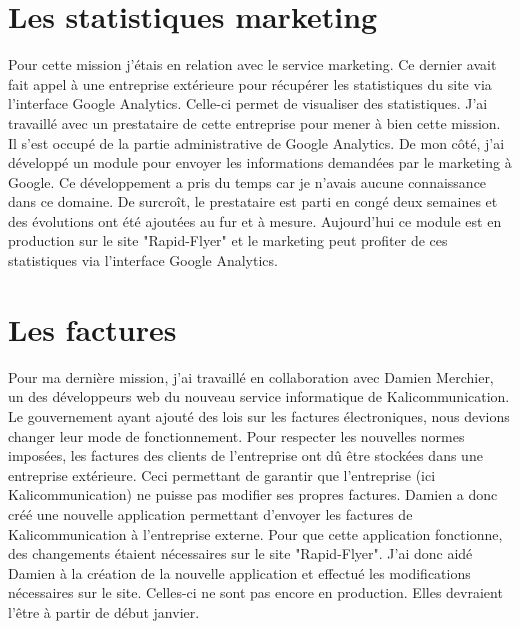 \section{Les statistiques marketing}
Pour cette mission j'étais en relation avec le service marketing. Ce dernier avait fait appel à une entreprise extérieure pour récupérer les statistiques du site via l'interface Google Analytics. Celle-ci permet de visualiser des statistiques.\newline
J'ai travaillé avec un prestataire de cette entreprise pour mener à bien cette mission. Il s'est occupé de la partie administrative de Google Analytics. De mon côté, j'ai développé un module pour envoyer les informations demandées par le marketing à Google. Ce développement a pris du temps car je n'avais aucune connaissance dans ce domaine. De surcroît, le prestataire est parti en congé deux semaines et des évolutions ont été ajoutées au fur et à mesure. Aujourd'hui ce module est en production sur le site "Rapid-Flyer" et le marketing peut profiter de ces statistiques via l'interface Google Analytics.

\section{Les factures}
Pour ma dernière mission, j'ai travaillé en collaboration avec Damien Merchier, un des développeurs web du nouveau service informatique de Kalicommunication.\newline
Le gouvernement ayant ajouté des lois sur les factures électroniques, nous devions changer leur mode de fonctionnement. Pour respecter les nouvelles normes imposées, les factures des clients de l'entreprise ont dû être stockées dans une entreprise extérieure. Ceci permettant de garantir que l'entreprise (ici Kalicommunication) ne puisse pas modifier ses propres factures.\newline
Damien a donc créé une nouvelle application permettant d'envoyer les factures de Kalicommunication à l'entreprise externe. Pour que cette application fonctionne, des changements étaient nécessaires sur le site "Rapid-Flyer". J'ai donc aidé Damien à la création de la nouvelle application et effectué les modifications nécessaires sur le site. Celles-ci ne sont pas encore en production. Elles devraient l'être à partir de début janvier.